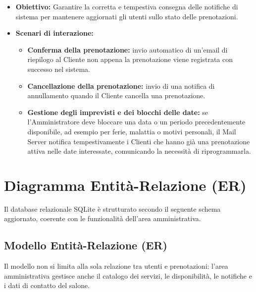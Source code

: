 \documentclass[12pt,a4paper]{article}
\begin{document}
\begin{itemize}
    \item \textbf{Obiettivo:} Garantire la corretta e tempestiva consegna delle notifiche di sistema per mantenere aggiornati gli utenti sullo stato delle prenotazioni.
    \item \textbf{Scenari di interazione:}
    \begin{itemize}
        \item \textbf{Conferma della prenotazione:} invio automatico di un'email di riepilogo al Cliente non appena la prenotazione viene registrata con successo nel sistema.
        \item \textbf{Cancellazione della prenotazione:} invio di una notifica di annullamento quando il Cliente cancella una prenotazione.
        \item \textbf{Gestione degli imprevisti e dei blocchi delle date:} se l'Amministratore deve bloccare una data o un periodo precedentemente disponibile, ad esempio per ferie, malattia o motivi personali, il Mail Server notifica tempestivamente i Clienti che hanno già una prenotazione attiva nelle date interessate, comunicando la necessità di riprogrammarla.
    \end{itemize}
\end{itemize}


\newpage

\section{Diagramma Entità-Relazione (ER)}
Il database relazionale SQLite è strutturato secondo il seguente schema aggiornato, coerente con le funzionalità dell'area amministrativa.


\subsection{Modello Entità-Relazione (ER)}
Il modello non si limita alla sola relazione tra utenti e prenotazioni: l'area amministrativa gestisce anche il catalogo dei servizi, le disponibilità, le notifiche e i dati di contatto del salone.
\end{document}
